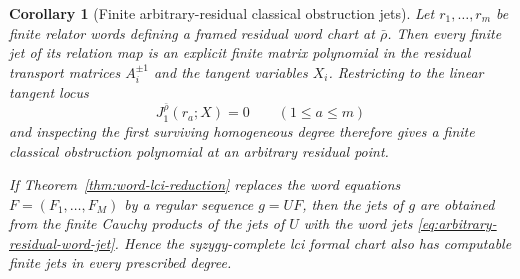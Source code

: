 \documentclass[11pt]{article}
\newtheorem{corollary}[theorem]{Corollary}
\theoremstyle{definition}
\begin{document}
\begin{corollary}[Finite arbitrary-residual classical obstruction jets]\label{cor:arbitrary-residual-classical-obstruction}
Let $r_1,\ldots,r_m$ be finite relator words defining a framed residual word
chart at $\bar\rho$.  Then every finite jet of its relation map is an explicit
finite matrix polynomial in the residual transport matrices
$A_i^{\pm1}$ and the tangent variables $X_i$.  Restricting to the linear
tangent locus
\[
 J_1^{\bar\rho}(r_a;X)=0\qquad(1\le a\le m)
\]
and inspecting the first surviving homogeneous degree therefore gives a
finite classical obstruction polynomial at an arbitrary residual point.

If Theorem~\ref{thm:word-lci-reduction} replaces the word equations
$F=(F_1,\ldots,F_M)$ by a regular sequence $g=UF$, then the jets of $g$ are
obtained from the finite Cauchy products of the jets of $U$ with the word jets
\eqref{eq:arbitrary-residual-word-jet}.  Hence the syzygy-complete lci formal
chart also has computable finite jets in every prescribed degree.
\end{corollary}
\end{document}

